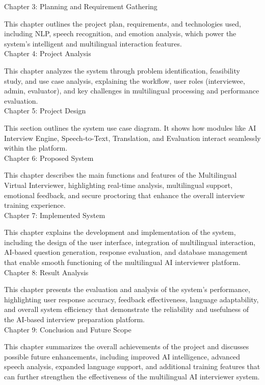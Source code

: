 \documentclass[12pt]{article}
\begin{document}
\noindent Chapter 3: Planning and Requirement Gathering

\noindent  This chapter outlines the project plan, requirements, and technologies used, including NLP, speech recognition, and emotion analysis, which power the system’s intelligent and multilingual interaction features.
 \\[2pt]

\noindent Chapter 4: Project Analysis

\noindent  This chapter analyzes the system through problem identification, feasibility study, and use case analysis, explaining the workflow, user roles (interviewee, admin, evaluator), and key challenges in multilingual processing and performance evaluation.  \\[2pt]   

\noindent Chapter 5: Project Design

\noindent  This section outlines the system use case diagram. It shows how modules like AI Interview Engine, Speech-to-Text, Translation, and Evaluation interact seamlessly within the platform. \\[2pt]

\noindent Chapter 6: Proposed System

\noindent  This chapter describes the main functions and features of the Multilingual Virtual Interviewer, highlighting real-time analysis, multilingual support, emotional feedback, and secure proctoring that enhance the overall interview training experience. \\[2pt]
	
\noindent Chapter 7: Implemented System

\noindent  This chapter explains the development and implementation of the system, including the design of the user interface, integration of multilingual interaction, AI-based question generation, response evaluation, and database management that enable smooth functioning of the multilingual AI interviewer platform. \\[2pt]

\noindent Chapter 8: Result Analysis

\noindent  This chapter presents the evaluation and analysis of the system’s performance, highlighting user response accuracy, feedback effectiveness, language adaptability, and overall system efficiency that demonstrate the reliability and usefulness of the AI-based interview preparation platform.  \\[2pt]

\noindent Chapter 9: Conclusion and Future Scope

\noindent  This chapter summarizes the overall achievements of the project and discusses possible future enhancements, including improved AI intelligence, advanced speech analysis, expanded language support, and additional training features that can further strengthen the effectiveness of the multilingual AI interviewer system.  \\[2pt]
\end{document}
